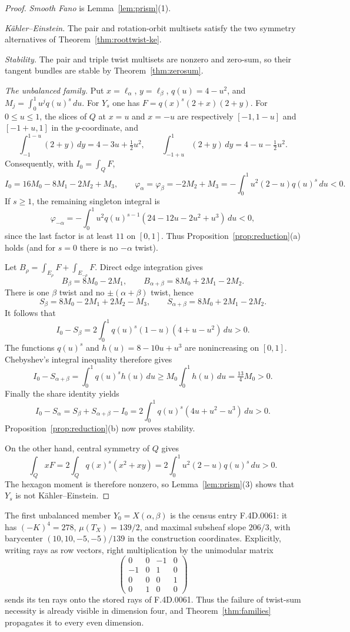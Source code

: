 \documentclass[11pt]{amsart}
\theoremstyle{definition}
\theoremstyle{remark}
\begin{document}
\begin{proof}
\emph{Smooth Fano} is Lemma~\ref{lem:prism}(1).

\emph{K\"ahler--Einstein.} The pair and rotation-orbit multisets satisfy
the two symmetry alternatives of Theorem~\ref{thm:roottwist-ke}.

\emph{Stability.} The pair and triple twist multisets are nonzero and
zero-sum, so their tangent bundles are stable by
Theorem~\ref{thm:zerosum}.

\emph{The unbalanced family.} Put $x=\ell_\alpha$, $y=\ell_\beta$,
$q(u)=4-u^2$, and
$M_j=\int_0^1u^jq(u)^s\,du$. For $Y_s$ one has
$F=q(x)^s(2+x)(2+y)$. For $0\le u\le1$, the slices of $Q$ at $x=u$ and
$x=-u$ are respectively $[-1,1-u]$ and $[-1+u,1]$ in the $y$-coordinate,
and
\[
\int_{-1}^{1-u}(2+y)\,dy=4-3u+\tfrac12u^2,
\qquad
\int_{-1+u}^{1}(2+y)\,dy=4-u-\tfrac12u^2.
\]
Consequently, with $I_0=\int_QF$,
\[
I_0=16M_0-8M_1-2M_2+M_3,
\qquad
\varphi_\alpha=\varphi_\beta=-2M_2+M_3
=-\int_0^1u^2(2-u)q(u)^s\,du<0.
\]
If $s\ge1$, the remaining singleton integral is
\[
\varphi_{-\alpha}=-\int_0^1u^2q(u)^{s-1}
(24-12u-2u^2+u^3)\,du<0,
\]
since the last factor is at least $11$ on $[0,1]$. Thus
Proposition~\ref{prop:reduction}(a) holds (and for $s=0$ there is no
$-\alpha$ twist).

Let $B_\rho=\int_{E_\rho}F+\int_{E_{-\rho}}F$. Direct edge integration
gives
\[
B_\beta=8M_0-2M_1,
\qquad
B_{\alpha+\beta}=8M_0+2M_1-2M_2.
\]
There is one $\beta$ twist and no $\pm(\alpha+\beta)$ twist, hence
\[
S_\beta=8M_0-2M_1+2M_2-M_3,
\qquad
S_{\alpha+\beta}=8M_0+2M_1-2M_2.
\]
It follows that
\[
I_0-S_\beta=2\int_0^1q(u)^s(1-u)(4+u-u^2)\,du>0.
\]
The functions $q(u)^s$ and $h(u)=8-10u+u^3$ are nonincreasing on
$[0,1]$. Chebyshev's integral inequality therefore gives
\[
I_0-S_{\alpha+\beta}=\int_0^1q(u)^sh(u)\,du
\ge M_0\int_0^1h(u)\,du=\tfrac{13}{4}M_0>0.
\]
Finally the share identity yields
\[
I_0-S_\alpha=S_\beta+S_{\alpha+\beta}-I_0
=2\int_0^1q(u)^s(4u+u^2-u^3)\,du>0.
\]
Proposition~\ref{prop:reduction}(b) now proves stability.

On the other hand, central symmetry of $Q$ gives
\[
\int_QxF=2\int_Qq(x)^s(x^2+xy)
=2\int_0^1u^2(2-u)q(u)^s\,du>0.
\]
The hexagon moment is therefore nonzero, so Lemma~\ref{lem:prism}(3) shows
that $Y_s$ is not K\"ahler--Einstein.
\end{proof}

The first unbalanced member $Y_0=X(\alpha,\beta)$ is the census entry
\textsf{F.4D.0061}: it has $(-K)^4=278$, $\mu(T_X)=139/2$, and maximal
subsheaf slope $206/3$, with barycenter
$(10,10,-5,-5)/139$ in the construction coordinates. Explicitly, writing
rays as row vectors, right multiplication by the unimodular matrix
\[
\begin{pmatrix}
0&0&-1&0\\ -1&0&1&0\\ 0&0&0&1\\ 0&1&0&0
\end{pmatrix}
\]
sends its ten rays onto the stored rays of \textsf{F.4D.0061}. Thus the failure
of twist-sum necessity is already visible in dimension four, and
Theorem~\ref{thm:families} propagates it to every even dimension.
\end{document}
